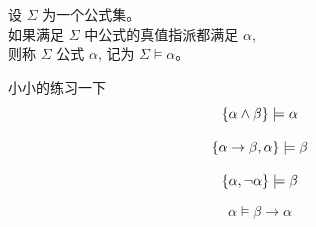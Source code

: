 \begin{frame}{}
  \begin{definition}
    \begin{center}
      设 $\Sigma$ 为一个公式集。\\[3pt]
      如果满足 $\Sigma$ 中公式的真值指派都满足 $\alpha$, \\[3pt]
      则称 $\Sigma$ 公式 $\alpha$,
      记为 $\Sigma \models \alpha$。
    \end{center}
  \end{definition}

  \pause
  \begin{exampleblock}{小小的练习一下}
    \[
      \{\alpha \land \beta\} \models \alpha
    \]

    \pause
    \[
      \{\alpha \to \beta, \alpha\} \models \beta
    \]

    \pause
    \[
      \{\alpha, \lnot \alpha\} \models \beta
    \]

    \pause
    \[
      \alpha \models \beta \to \alpha
    \]
  \end{exampleblock}
\end{frame}

%
%
%
%

